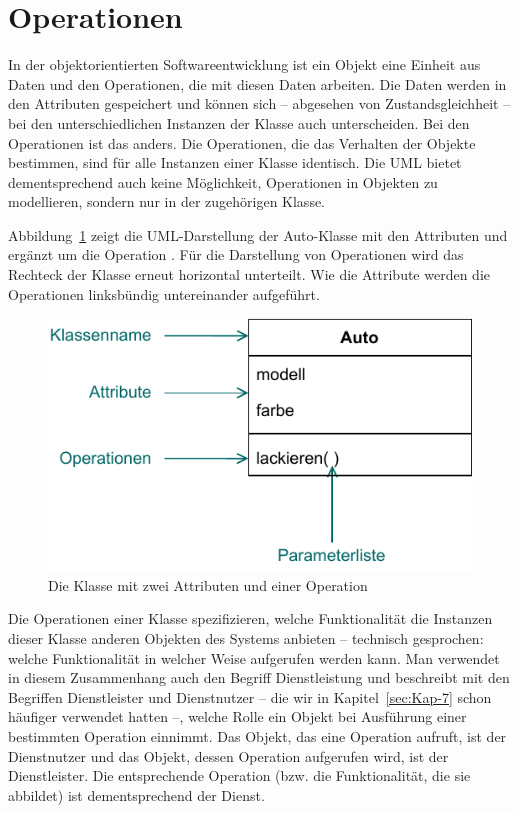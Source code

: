 \section{Operationen}
\label{sec:Kap-8.2}

In der objektorientierten Softwareentwicklung ist ein Objekt eine Einheit aus \mbox{Daten} und den Operationen, die mit diesen Daten arbeiten. Die Daten werden in den Attri\-buten gespeichert und können sich – abgesehen von Zustandsgleichheit – bei den unterschiedlichen Instanzen der Klasse auch unterscheiden. Bei den Operationen ist das anders. Die Operationen, die das Verhalten der Objekte bestimmen, sind für alle Instanzen einer Klasse identisch. Die UML bietet dementsprechend auch keine Möglichkeit, Operationen in Objekten zu modellieren, sondern nur in der zugehörigen Klasse.

Abbildung~\ref{fig:klasse_auto} zeigt die UML-Darstellung der Auto-Klasse mit den Attributen 
\linebreak %
 und  ergänzt um die Operation . Für die Darstellung von Operationen wird das Rechteck der Klasse erneut horizontal unterteilt. Wie die Attri\-bute werden die Operationen linksbündig untereinander aufgeführt. 

\vspace{\baselineskip} %

\begin{figure}[h!]
	\centering
	\includegraphics[scale=1.0]{Bilder/Kapitel-8/klasse_auto.pdf}
	\caption{Die Klasse  mit zwei Attributen und einer Operation}
	\label{fig:klasse_auto}
\end{figure}

Die Operationen einer Klasse spezifizieren, welche Funktionalität die Instanzen dieser Klasse anderen Objekten des Systems anbieten – technisch gesprochen: welche Funktionalität in welcher Weise aufgerufen werden kann. Man verwendet in diesem Zusammenhang auch den Begriff Dienstleistung
und beschreibt mit den Begriffen Dienstleister und Dienstnutzer -- die wir in Kapitel~\ref{sec:Kap-7} schon häufiger verwendet hatten --, welche Rolle ein Objekt bei Ausführung einer bestimmten Operation einnimmt. Das Objekt, das eine Operation aufruft, ist der Dienstnutzer und das Objekt, dessen Operation aufgerufen wird, ist der Dienstleister. Die entsprechende Operation (bzw. die Funktionalität, die sie abbildet) ist dementsprechend der Dienst. 

